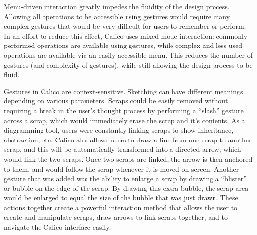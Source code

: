 Menu-driven interaction greatly impedes the fluidity of the design process. Allowing all operations to be accessible using gestures would require many complex gestures that would be very difficult for users to remember or perform. In an effort to reduce this effect, Calico uses mixed-mode interaction: commonly performed operations are available using gestures, while complex and less used operations are available via an easily accessible menu. This reduces the number of gestures (and complexity of gestures), while still allowing the design process to be fluid.

Gestures in Calico are context-sensitive. Sketching can have different meanings depending on various parameters. Scraps could be easily removed without requiring a break in the user's thought process by performing a ``slash'' gesture across a scrap, which would immediately erase the scrap and it's contents.
As a diagramming tool, users were constantly linking scraps to show inheritance, abstraction, etc.
Calico also allows users to draw a line from one scrap to another scrap, and this will be automatically transformed into a directed arrow, which would link the two scraps.
Once two scraps are linked, the arrow is then anchored to them, and would follow the scrap whenever it is moved on screen.
Another gesture that was added was the ability to enlarge a scrap by drawing a ``blister'' or bubble on the edge of the scrap.
By drawing this extra bubble, the scrap area would be enlarged to equal the size of the bubble that was just drawn. These actions together create a powerful interaction method that allows the user to create and manipulate scraps, draw arrows to link scraps together, and to navigate the Calico interface easily. 



